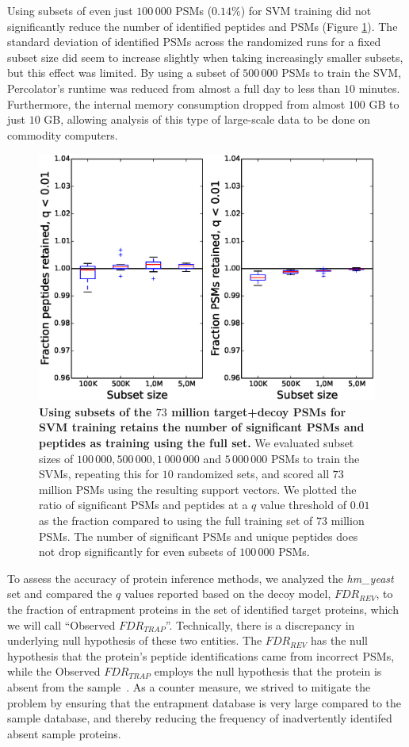 \documentclass{article}
\begin{document}
Using subsets of even just $100\,000$ PSMs ($0.14\%$) for SVM training
did not significantly reduce the number of identified peptides and
PSMs (Figure \ref{fig:subset}). The standard deviation of identified
PSMs across the randomized runs for a fixed subset size did seem to
increase slightly when taking increasingly smaller subsets, but this
effect was limited. By using a subset of $500\,000$ PSMs to train the
SVM, Percolator’s runtime was reduced from almost a full day to less
than $10$ minutes. Furthermore, the internal memory consumption
dropped from almost $100$ GB to just $10$ GB, allowing analysis of
this type of large-scale data to be done on commodity computers.

\begin{figure}[!htp]
\begin{center}
\includegraphics[width=0.6\linewidth]{./img/subset-performance}
\caption{\label{fig:subset}\textbf{Using subsets of the $73$ million
target+decoy PSMs for SVM training retains the number of significant
PSMs and peptides as training using the full set.} We evaluated subset
sizes of $100\,000, 500\,000, 1\,000\,000$ and $5\,000\,000$ PSMs to
train the SVMs, repeating this for $10$ randomized sets, and scored
all $73$ million PSMs using the resulting support vectors. We plotted
the ratio of significant PSMs and peptides at a $q$ value threshold of
$0.01$ as the fraction compared to using the full training set of $73$
million PSMs. The number of significant PSMs and unique peptides does
not drop significantly for even subsets of $100\,000$ PSMs.}
\end{center}
\end{figure}

To assess the accuracy of protein inference methods, we analyzed the
{\em hm\_yeast} set and compared the $q$ values reported based on the
decoy model, $FDR_{REV}$, to the fraction of entrapment proteins in
the set of identified target proteins, which we will call ``Observed
$FDR_{TRAP}$''. Technically, there is a discrepancy in underlying null
hypothesis of these two entities. The $FDR_{REV}$ has the null
hypothesis that the protein's peptide identifications came from
incorrect PSMs, while the Observed $FDR_{TRAP}$ employs the null
hypothesis that the protein is absent from the sample~\cite{the:how}.
As a counter measure, we strived to mitigate the problem by ensuring
that the entrapment database is very large compared to the sample
database, and thereby reducing the frequency of inadvertently
identifed absent sample proteins.
\end{document}
